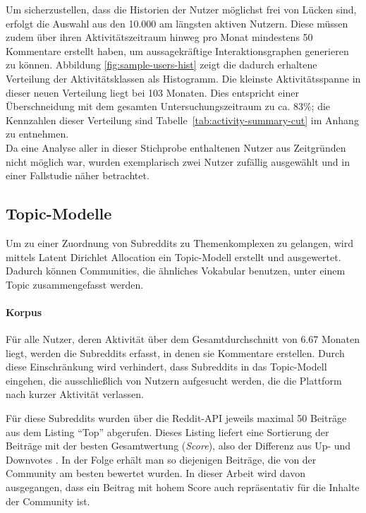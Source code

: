 \documentclass[11pt,a4paper,twoside]{article}
\let\oldpar\paragraph
\renewcommand{\paragraph}{\oldpar*}
\begin{document}
Um sicherzustellen, dass die Historien der Nutzer möglichst frei von
Lücken sind, erfolgt die Auswahl aus den 10.000 am längsten aktiven
Nutzern. Diese müssen zudem über ihren Aktivitätszeitraum hinweg pro
Monat mindestens 50 Kommentare erstellt haben, um aussagekräftige
Interaktionsgraphen generieren zu können. Abbildung
\ref{fig:sample-users-hist} zeigt die dadurch erhaltene Verteilung der
Aktivitätsklassen als Histogramm. Die kleinste Aktivitätsspanne in
dieser neuen Verteilung liegt bei 103 Monaten. Dies entspricht einer
Überschneidung mit dem gesamten Untersuchungszeitraum zu ca. 83\%; die
Kennzahlen dieser Verteilung sind Tabelle~\ref{tab:activity-summary-cut}
im Anhang zu entnehmen.\\
Da eine Analyse aller in dieser Stichprobe enthaltenen Nutzer aus
Zeitgründen nicht möglich war, wurden exemplarisch zwei Nutzer zufällig
ausgewählt und in einer Fallstudie näher betrachtet.

\hypertarget{meth-lda}{%
\subsection{Topic-Modelle}\label{meth-lda}}

Um zu einer Zuordnung von Subreddits zu Themenkomplexen zu gelangen,
wird mittels Latent Dirichlet Allocation ein Topic-Modell erstellt und
ausgewertet. Dadurch können Communities, die ähnliches Vokabular
benutzen, unter einem Topic zusammengefasst werden.

\hypertarget{korpus}{%
\paragraph{Korpus}\label{korpus}}

Für alle Nutzer, deren Aktivität über dem Gesamtdurchschnitt von 6.67
Monaten liegt, werden die Subreddits erfasst, in denen sie Kommentare
erstellen. Durch diese Einschränkung wird verhindert, dass Subreddits in
das Topic-Modell eingehen, die ausschließlich von Nutzern aufgesucht
werden, die die Plattform nach kurzer Aktivität verlassen.

Für diese Subreddits wurden über die Reddit-API jeweils maximal 50
Beiträge aus dem Listing \enquote{Top} abgerufen. Dieses Listing liefert
eine Sortierung der Beiträge mit der besten Gesamtwertung
(\emph{Score}), also der Differenz aus Up- und Downvotes
\autocite{RedditSrc}. In der Folge erhält man so diejenigen Beiträge,
die von der Community am besten bewertet wurden. In dieser Arbeit wird
davon ausgegangen, dass ein Beitrag mit hohem Score auch repräsentativ
für die Inhalte der Community ist.
\end{document}
